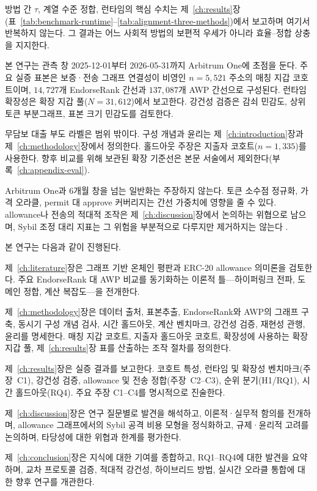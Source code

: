 방법 간 $\tau$, 계열 수준 정합, 런타임의 핵심 수치는 제~\ref{ch:results}장(표~\ref{tab:benchmark-runtime}--\ref{tab:alignment-three-methods})에서 보고하며 여기서 반복하지 않는다. 그 결과는 어느 사회적 방법의 보편적 우세가 아니라 효율--정합 상충을 지지한다.


본 연구는 관측 창 2025-12-01부터 2026-05-31까지 Arbitrum One에 초점을 둔다. 주요 실증 표본은 보증·전송 그래프 연결성이 비영인 $n=5{,}521$ 주소의 매칭 지갑 코호트이며, $14{,}727$개 EndorseRank 간선과 $137{,}087$개 AWP 간선으로 구성된다. 런타임 확장성은 확장 지갑 풀($N=31{,}612$)에서 보고한다. 강건성 검증은 감쇠 민감도, 상위 토큰 부분그래프, 표본 크기 민감도를 검토한다.

무담보 대출 부도 라벨은 범위 밖이다. 구성 개념과 윤리는 제~\ref{ch:introduction}장과 제~\ref{ch:methodology}장에서 정의한다. 홀드아웃 주장은 지출자 코호트($n=1{,}335$)를 사용한다. 향후 비교를 위해 보관된 확장 기준선은 본문 서술에서 제외한다(부록~\ref{ch:appendix-eval}).

Arbitrum One과 6개월 창을 넘는 일반화는 주장하지 않는다. 토큰 소수점 정규화, 가격 오라클, permit 대 approve 커버리지는 간선 가중치에 영향을 줄 수 있다. allowance나 전송의 적대적 조작은 제~\ref{ch:discussion}장에서 논의하는 위협으로 남으며, Sybil 조정 대리 지표는 그 위험을 부분적으로 다루지만 제거하지는 않는다 .


본 연구는 다음과 같이 진행된다.

제~\ref{ch:literature}장은 그래프 기반 온체인 평판과 ERC-20 allowance 의미론을 검토한다. 주요 EndorseRank 대 AWP 비교를 동기화하는 이론적 틀---하이퍼링크 전파, 도메인 정합, 계산 복잡도---을 전개한다.

제~\ref{ch:methodology}장은 데이터 출처, 표본추출, EndorseRank와 AWP의 그래프 구축, 동시기 구성 개념 검사, 시간 홀드아웃, 계산 벤치마크, 강건성 검증, 재현성 관행, 윤리를 명세한다. 매칭 지갑 코호트, 지출자 홀드아웃 코호트, 확장성에 사용하는 확장 지갑 풀, 제~\ref{ch:results}장 표를 산출하는 조작 절차를 정의한다.

제~\ref{ch:results}장은 실증 결과를 보고한다. 코호트 특성, 런타임 및 확장성 벤치마크(주장~C1), 강건성 검증, allowance 및 전송 정합(주장~C2--C3), 순위 분기(H1/RQ1), 시간 홀드아웃(RQ4). 주요 주장 C1--C4를 명시적으로 진술한다.

제~\ref{ch:discussion}장은 연구 질문별로 발견을 해석하고, 이론적·실무적 함의를 전개하며, allowance 그래프에서의 Sybil 공격 비용 모형을 정식화하고, 규제·윤리적 고려를 논의하며, 타당성에 대한 위협과 한계를 평가한다.

제~\ref{ch:conclusion}장은 지식에 대한 기여를 종합하고, RQ1--RQ4에 대한 발견을 요약하며, 교차 프로토콜 검증, 적대적 강건성, 하이브리드 방법, 실시간 오라클 통합에 대한 향후 연구를 개관한다.
